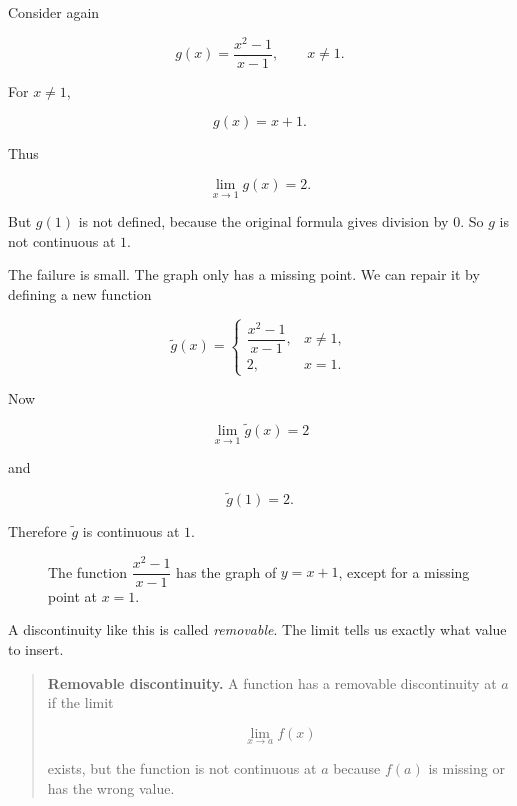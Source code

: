 Consider again

\[
g(x)=\frac{x^2-1}{x-1},
\qquad x\neq1.
\]

For \(x\neq1\),

\[
g(x)=x+1.
\]

Thus

\[
\lim_{x\to1}g(x)=2.
\]

But \(g(1)\) is not defined, because the original formula gives division by \(0\).  So \(g\) is not continuous at \(1\).

The failure is small.  The graph only has a missing point.  We can repair it by defining a new function

\[
\widetilde g(x)=
\begin{cases}
\dfrac{x^2-1}{x-1}, & x\neq1,\\[6pt]
2, & x=1.
\end{cases}
\]

Now

\[
\lim_{x\to1}\widetilde g(x)=2
\]

and

\[
\widetilde g(1)=2.
\]

Therefore \(\widetilde g\) is continuous at \(1\).

\begin{figure}[h]
\centering
{}
\caption{The function \(\dfrac{x^2-1}{x-1}\) has the graph of \(y=x+1\), except for a missing point at \(x=1\).}
\label{fig:removable-continuity}
\end{figure}

A discontinuity like this is called \emph{removable}.  The limit tells us exactly what value to insert.

\begin{quote}
\textbf{Removable discontinuity.}
A function has a removable discontinuity at \(a\) if the limit

\[
\lim_{x\to a}f(x)
\]

exists, but the function is not continuous at \(a\) because \(f(a)\) is missing or has the wrong value.
\end{quote}

